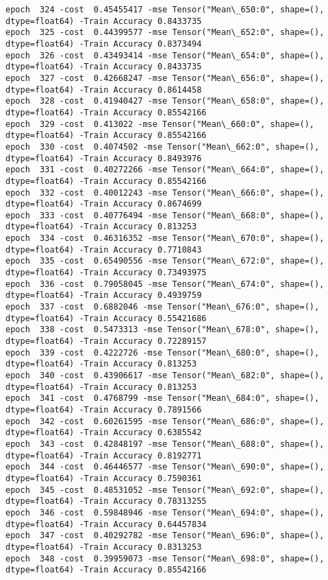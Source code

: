 \documentclass[11pt]{article}
\begin{document}
\begin{Verbatim}[commandchars=\\\{\}]
epoch  324 -cost  0.45455417 -mse Tensor("Mean\_650:0", shape=(), dtype=float64) -Train Accuracy 0.8433735
epoch  325 -cost  0.44399577 -mse Tensor("Mean\_652:0", shape=(), dtype=float64) -Train Accuracy 0.8373494
epoch  326 -cost  0.43493414 -mse Tensor("Mean\_654:0", shape=(), dtype=float64) -Train Accuracy 0.8433735
epoch  327 -cost  0.42668247 -mse Tensor("Mean\_656:0", shape=(), dtype=float64) -Train Accuracy 0.8614458
epoch  328 -cost  0.41940427 -mse Tensor("Mean\_658:0", shape=(), dtype=float64) -Train Accuracy 0.85542166
epoch  329 -cost  0.413022 -mse Tensor("Mean\_660:0", shape=(), dtype=float64) -Train Accuracy 0.85542166
epoch  330 -cost  0.4074502 -mse Tensor("Mean\_662:0", shape=(), dtype=float64) -Train Accuracy 0.8493976
epoch  331 -cost  0.40272266 -mse Tensor("Mean\_664:0", shape=(), dtype=float64) -Train Accuracy 0.85542166
epoch  332 -cost  0.40012243 -mse Tensor("Mean\_666:0", shape=(), dtype=float64) -Train Accuracy 0.8674699
epoch  333 -cost  0.40776494 -mse Tensor("Mean\_668:0", shape=(), dtype=float64) -Train Accuracy 0.813253
epoch  334 -cost  0.46316352 -mse Tensor("Mean\_670:0", shape=(), dtype=float64) -Train Accuracy 0.7710843
epoch  335 -cost  0.65490556 -mse Tensor("Mean\_672:0", shape=(), dtype=float64) -Train Accuracy 0.73493975
epoch  336 -cost  0.79058045 -mse Tensor("Mean\_674:0", shape=(), dtype=float64) -Train Accuracy 0.4939759
epoch  337 -cost  0.6882046 -mse Tensor("Mean\_676:0", shape=(), dtype=float64) -Train Accuracy 0.55421686
epoch  338 -cost  0.5473313 -mse Tensor("Mean\_678:0", shape=(), dtype=float64) -Train Accuracy 0.72289157
epoch  339 -cost  0.4222726 -mse Tensor("Mean\_680:0", shape=(), dtype=float64) -Train Accuracy 0.813253
epoch  340 -cost  0.43906617 -mse Tensor("Mean\_682:0", shape=(), dtype=float64) -Train Accuracy 0.813253
epoch  341 -cost  0.4768799 -mse Tensor("Mean\_684:0", shape=(), dtype=float64) -Train Accuracy 0.7891566
epoch  342 -cost  0.60261595 -mse Tensor("Mean\_686:0", shape=(), dtype=float64) -Train Accuracy 0.6385542
epoch  343 -cost  0.42848197 -mse Tensor("Mean\_688:0", shape=(), dtype=float64) -Train Accuracy 0.8192771
epoch  344 -cost  0.46446577 -mse Tensor("Mean\_690:0", shape=(), dtype=float64) -Train Accuracy 0.7590361
epoch  345 -cost  0.48531052 -mse Tensor("Mean\_692:0", shape=(), dtype=float64) -Train Accuracy 0.78313255
epoch  346 -cost  0.59848946 -mse Tensor("Mean\_694:0", shape=(), dtype=float64) -Train Accuracy 0.64457834
epoch  347 -cost  0.40292782 -mse Tensor("Mean\_696:0", shape=(), dtype=float64) -Train Accuracy 0.8313253
epoch  348 -cost  0.39959073 -mse Tensor("Mean\_698:0", shape=(), dtype=float64) -Train Accuracy 0.85542166

\end{Verbatim}
\end{document}

